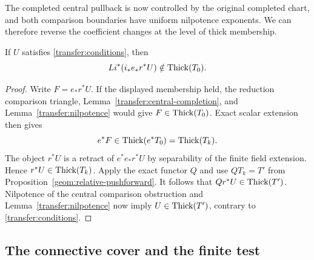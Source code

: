 The completed central pullback is now controlled by the original
completed chart, and both comparison boundaries have uniform nilpotence
exponents. We can therefore reverse the coefficient changes at the
level of thick membership.

\begin{lemma}
\label{transfer:reduced-exclusion}
If $U$ satisfies \eqref{transfer:conditions}, then
\[
 Li^*(i_*e_*r^*U)\notin\operatorname{Thick}(T_0).
\]
\end{lemma}

\begin{proof}
Write $F=e_*r^*U$. If the displayed membership held, the
reduction comparison triangle, Lemma~\ref{transfer:central-completion},
and Lemma~\ref{transfer:nilpotence} would give
$F\in\operatorname{Thick}(T_0)$. Exact scalar extension then gives
\[
 e^*F\in\operatorname{Thick}(e^*T_0)=\operatorname{Thick}(T_k).
\]
The object $r^*U$ is a retract of $e^*e_*r^*U$ by separability
of the finite field extension. Hence $r^*U\in\operatorname{Thick}(T_k)$.
Apply the exact functor $Q$ and use
$QT_k=T'$ from Proposition~\ref{geom:relative-pushforward}.
It follows that $Qr^*U\in\operatorname{Thick}(T')$. Nilpotence of the
central comparison obstruction and
Lemma~\ref{transfer:nilpotence} now imply
$U\in\operatorname{Thick}(T')$, contrary to \eqref{transfer:conditions}.
\end{proof}

\subsection{The connective cover and the finite test}


